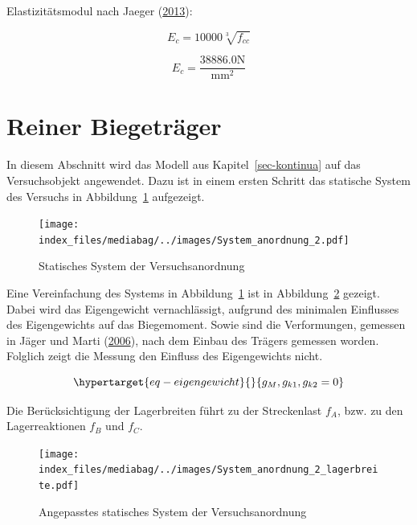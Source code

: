 \documentclass[
  letterpaper,
]{scrreprt}
\begin{document}
Elastizitätsmodul nach Jaeger
(\protect\hyperlink{ref-Jaeger2013}{2013}):

\begin{equation}E_{c} = 10000 \sqrt[3]{f_{cc}}\end{equation}

\begin{equation}E_{c} = \frac{38886.0 \text{N}}{\text{mm}^{2}}\end{equation}

\hypertarget{reiner-biegetruxe4ger}{%
\section{Reiner Biegeträger}\label{reiner-biegetruxe4ger}}

In diesem Abschnitt wird das Modell aus Kapitel~\ref{sec-kontinua} auf
das Versuchsobjekt angewendet. Dazu ist in einem ersten Schritt das
statische System des Versuchs in Abbildung~\ref{fig-system_2}
aufgezeigt.

\begin{figure}[H]

{\centering \texttt{[image: index\_files/mediabag/../images/System\_anordnung\_2.pdf]}

}

\caption{\label{fig-system_2}Statisches System der Versuchsanordnung}

\end{figure}

Eine Vereinfachung des Systems in Abbildung~\ref{fig-system_2} ist in
Abbildung~\ref{fig-system_2_lager} gezeigt. Dabei wird das Eigengewicht
vernachlässigt, aufgrund des minimalen Einflusses des Eigengewichts auf
das Biegemoment. Sowie sind die Verformungen, gemessen in Jäger und
Marti (\protect\hyperlink{ref-Jaeger2006}{2006}), nach dem Einbau des
Trägers gemessen worden. Folglich zeigt die Messung den Einfluss des
Eigengewichts nicht.

\begin{equation}\protect\hypertarget{eq-eigengewicht}{}{
g_M, g_{k1}, g_{k2} = 0
}\label{eq-eigengewicht}\end{equation}

Die Berücksichtigung der Lagerbreiten führt zu der Streckenlast \(f_A\),
bzw. zu den Lagerreaktionen \(f_B\) und \(f_C\).

\begin{figure}[H]

{\centering \texttt{[image: index\_files/mediabag/../images/System\_anordnung\_2\_lagerbreite.pdf]}

}

\caption{\label{fig-system_2_lager}Angepasstes statisches System der
Versuchsanordnung}

\end{figure}
\end{document}
